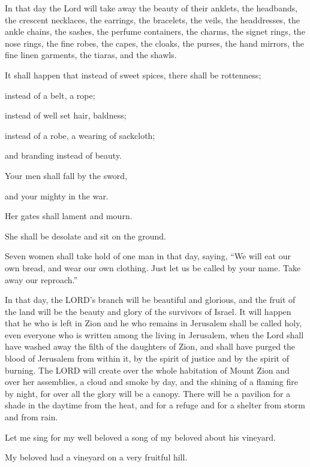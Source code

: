 \myverse{}In that day the Lord will take away the beauty of their anklets,
the headbands, the crescent necklaces,
\myverse{}the earrings, the bracelets, the veils,
\myverse{}the headdresses, the ankle chains, the sashes, the perfume containers, the
charms,
\myverse{}the signet rings, the nose rings,
\myverse{}the fine robes, the capes, the cloaks, the purses,
\myverse{}the hand mirrors, the fine linen garments, the tiaras, and the shawls.

\myverse{}It shall happen that instead of sweet spices, there shall be
rottenness;

instead of a belt, a rope;

instead of well set hair, baldness;

instead of a robe, a wearing of sackcloth;

and branding instead of beauty.

\myverse{}Your men shall fall by the sword,

and your mighty in the war.

\myverse{}Her gates shall lament and mourn.

She shall be desolate and sit on the ground.


 \myverse*{}Seven women shall take hold of one man in that day, saying, “We
will eat our own bread, and wear our own clothing. Just let us be called by your name. Take away our reproach.”

\myverse{}In that day, the LORD’s branch will be beautiful and glorious,
and the fruit of the land will be the beauty and glory of the survivors of Israel.
\myverse{}It will happen that he who is left in Zion and he who remains in Jerusalem shall
be called holy, even everyone who is written among the living in Jerusalem,
\myverse{}when the Lord shall have washed away the filth of the daughters of Zion, and
shall have purged the blood of Jerusalem from within it, by the spirit of justice and by the spirit of
burning.
\myverse{}The LORD will create over the whole habitation of Mount Zion and over her assemblies,
a cloud and smoke by day, and the shining of a flaming fire by night, for over all the glory will be a
canopy.
\myverse{}There will be a pavilion for a shade in the daytime from the heat, and for a
refuge and for a shelter from storm and from rain.


\mychapter{} \myverse*{}Let me sing for my well beloved a song of my beloved about his
vineyard.

My beloved had a vineyard on a very fruitful hill.

